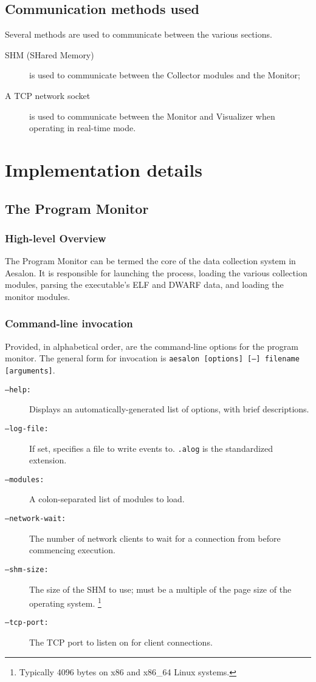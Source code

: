 \documentclass[a4paper,10pt]{report}
\begin{document}
\section{Communication methods used}
Several methods are used to communicate between the various sections.
\flushleft
\begin{description}
 \item[SHM (SHared Memory)] is used to communicate between the Collector modules and the Monitor;
 \item[\textnormal{A} TCP network socket] is used to communicate between the Monitor and Visualizer when operating in
  real-time mode.
\end{description}

\chapter{Implementation details}
\section{The Program Monitor}
\subsection{High-level Overview}
The Program Monitor can be termed the core of the data collection system in Aesalon. It is responsible for
launching the process, loading the various collection modules, parsing the executable's ELF and DWARF data,
and loading the monitor modules.

\subsection{Command-line invocation}
Provided, in alphabetical order, are the command-line options for the program monitor. The general form
for invocation is \texttt{aesalon [options] [--] filename [arguments]}.
\begin{description}
 \item[\texttt{--help:}] Displays an automatically-generated list of options, with brief descriptions.
 \item[\texttt{--log-file:}] If set, specifies a file to write events to. \texttt{.alog} is the standardized extension.
 \item[\texttt{--modules:}] A colon-separated list of modules to load.
 \item[\texttt{--network-wait:}] The number of network clients to wait for a connection from before commencing execution.
 \item[\texttt{--shm-size:}] The size of the SHM to use; must be a multiple of the page size of the operating system.%
  \footnote{Typically 4096 bytes on x86 and x86\_64 Linux systems.}
 \item[\texttt{--tcp-port:}] The TCP port to listen on for client connections.
\end{description}
\end{document}
